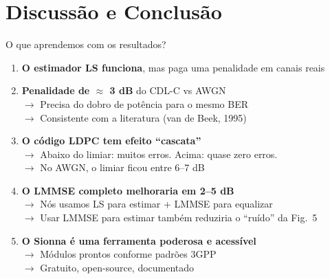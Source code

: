 \documentclass[aspectratio=169, 11pt]{beamer}
\begin{document}
\section{Discussão e Conclusão}

\begin{frame}{O que aprendemos com os resultados?}

    \begin{enumerate}
        \item \textbf{O estimador LS funciona}, mas paga uma penalidade em canais reais \pause

        \vspace{0.2cm}
        \item \textbf{Penalidade de $\approx$ 3 dB} do CDL-C vs AWGN\\
            \small $\to$ Precisa do dobro de potência para o mesmo BER\\
            $\to$ Consistente com a literatura (van de Beek, 1995) \pause

        \vspace{0.2cm}
        \item \normalsize \textbf{O código LDPC tem efeito ``cascata''}\\
            \small $\to$ Abaixo do limiar: muitos erros. Acima: quase zero erros.\\
            $\to$ No AWGN, o limiar ficou entre 6--7 dB \pause

        \vspace{0.2cm}
        \item \normalsize \textbf{O LMMSE completo melhoraria em 2--5 dB}\\
            \small $\to$ Nós usamos LS para estimar + LMMSE para equalizar\\
            $\to$ Usar LMMSE para estimar também reduziria o ``ruído'' da Fig.~5 \pause

        \vspace{0.2cm}
        \item \normalsize \textbf{O Sionna é uma ferramenta poderosa e acessível}\\
            \small $\to$ Módulos prontos conforme padrões 3GPP\\
            $\to$ Gratuito, open-source, documentado
    \end{enumerate}
\end{frame}
\end{document}
